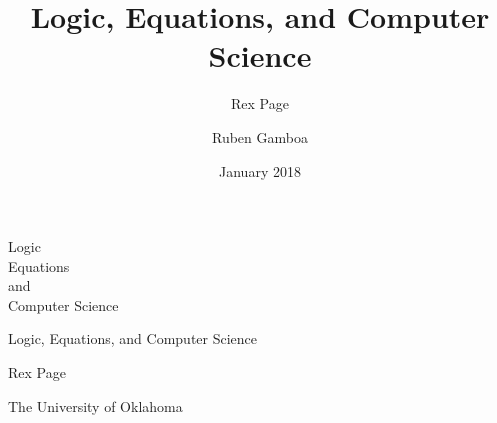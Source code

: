 \documentclass[letterpaper,10pt,extrafontsizesmtwoside,onecolumn,openright,fleqn]{memoir}
\title{Logic, Equations, and Computer Science}
\author{Rex Page \and Ruben Gamboa}
\date{January 2018}
\begin{document}
\frontmatter


\pagestyle{empty}


\vspace*{\fill}
\begin{adjustwidth}{1in}{1in}
\begin{flushleft}
\HUGE\sffamily Logic\\
\hspace{1cm}\HUGE\sffamily Equations\\
\hspace{2.5cm}\Huge\sffamily and\\
\hspace{2cm}\HUGE\sffamily Computer Science\\
\end{flushleft}
\end{adjustwidth}
\vspace*{\fill}
\cleardoublepage

\vspace*{\fill}
\begin{center}
\Huge\textsf{Logic, Equations, and Computer Science}\par
\end{center}

\vspace{1cm}

\begin{center}
\LARGE\textsf{Rex Page}\par
\Large\textsf{The University of Oklahoma}\par
\end{center}
\end{document}
